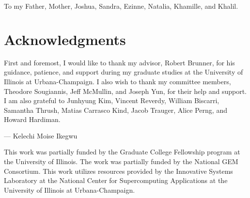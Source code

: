 \documentclass[12pt,edeposit,fullpage]{uiucthesis2014}
\begin{document}
\begin{dedication}
To my Father,  Mother,  Joshua,  Sandra,  Ezinne,  Natalia,  Khamille,  and Khalil.
\end{dedication}

\chapter*{Acknowledgments}

First and foremost, I would like to thank my advisor,  Robert Brunner, for his guidance,  patience,  and support during my graduate studies at the University of Illinois at Urbana-Champaign.
I also wish to thank my committee members, Theodore Sougiannis, Jeff McMullin, and Joseph Yun,  for their help and support.
I am also grateful to Junhyung Kim, Vincent Reverdy, William Biscarri,  Samantha Thrush,  Matias Carrasco Kind,  Jacob Trauger,  Alice Perng, and Howard Hardiman.

\begin{flushright}
--- Kelechi Moise Ikegwu
\end{flushright}

\vspace{10mm}

This work was partially funded by the Graduate College Fellowship program at the University of Illinois.  The work was partially funded by the National GEM Consortium.  This work utilizes resources provided by the Innovative Systems Laboratory at the National Center for Supercomputing Applications at the University of Illinois at Urbana-Champaign.


\tableofcontents
\end{document}
